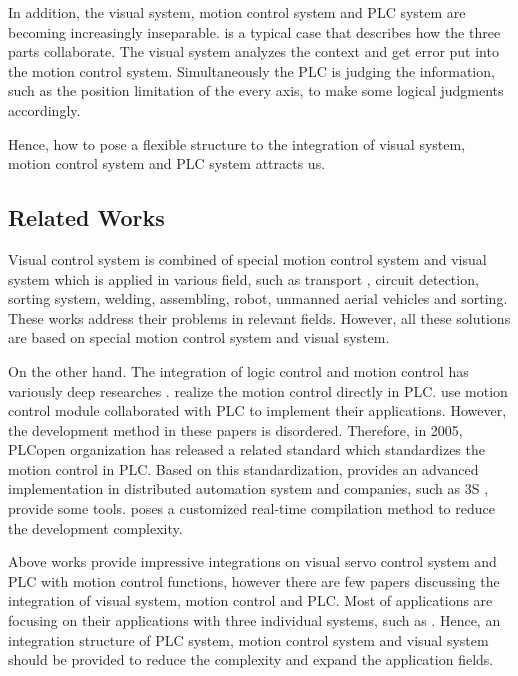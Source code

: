 \documentclass[journal,UTF8]{IEEEtran}
\begin{document}
In addition, the visual system, motion control system and PLC system are becoming increasingly inseparable. \cite{Chen2014A} is a typical case that describes how the three parts collaborate. The visual system analyzes the context and get error put into the motion control system. Simultaneously the PLC is judging the information, such as the position limitation of the every axis, to make some logical judgments accordingly. 

Hence, how to pose a flexible structure to the integration of visual system, motion control system and  PLC system attracts us.

\subsection{Related Works}

Visual control system is combined of special motion control system and visual system which is applied in various field, such as transport \cite{Xing2014Intersection}, circuit detection\cite{Nian2005An}, sorting system, welding\cite{Chen2014A}, assembling\cite{Wang2008Visual,Xiao2014Visual}, robot\cite{Wu2013Cloud,Tsai2017A}, unmanned aerial vehicles\cite{Guenard2010A,Serra2016Landing} and sorting\cite{Sun2013Automatic}. These works address their problems in relevant fields. However, all these solutions are based on special motion control system and visual system.

On the other hand. The integration of logic control and motion control has variously deep researches \cite{Ioannides2004Design,Shi2016The,Fang2017Design, syaichu2011model}. \cite{Ioannides2004Design,syaichu2011model} realize the motion control directly in PLC. \cite{Peng2011Linear, Qian2014A, OMRON2006CS1W} use motion control module collaborated with PLC to implement their applications. However, the development method in these papers is disordered. Therefore, in 2005, PLCopen organization has released a related standard \cite{PLCopen2005Function} which standardizes the motion control in PLC. Based on this standardization, \cite{S2006Advanced} provides an advanced implementation in distributed automation system and companies, such as 3S \cite{3S2017Logic}, provide some tools. \cite{wu2018customized} poses a customized real-time compilation method to reduce the development complexity.

Above works provide impressive integrations on visual servo control system and PLC with motion control functions, however there are few papers discussing the integration of visual system, motion control and PLC. Most of applications are focusing on their applications with three individual systems, such as \cite{Chen2014A}. Hence, an integration structure of PLC system, motion control system and visual system should be provided to reduce the complexity and expand the application fields.
\end{document}
